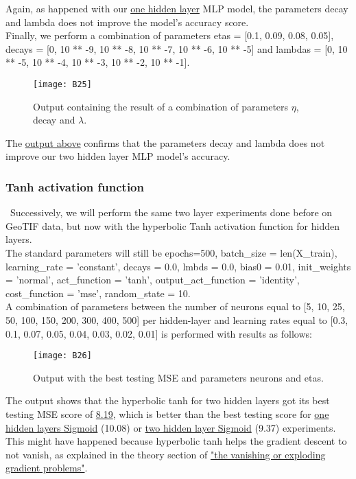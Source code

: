 Again, as happened with our \hyperref[fig:B9]{one hidden layer} MLP model, the parameters decay and lambda does not improve the model's accuracy score.\\

Finally, we perform a combination of parameters etas = [0.1, 0.09, 0.08, 0.05], decays = [0, 10 ** -9, 10 ** -8, 10 ** -7, 10 ** -6, 10 ** -5] and lambdas = [0, 10 ** -5, 10 ** -4, 10 ** -3, 10 ** -2, 10 ** -1].

\begin{figure}[H]
\label{fig:B17}
\centering
\texttt{[image: B25]}
\caption{Output containing the result of a combination of parameters $\eta$, decay and $\lambda$.}
\end{figure}

The \hyperref[fig:B17]{output above} confirms that the parameters decay and lambda does not improve our two hidden layer MLP model's accuracy.

\subsubsection{Tanh activation function}
\label{chap:Tanh activation function}

\qquad \, Successively, we will perform the same two layer experiments done before on GeoTIF data, but now with the hyperbolic Tanh activation function for hidden layers.\\

The standard parameters will still be epochs=500, batch\_size = len(X\_train), learning\_rate = 'constant', decays = 0.0, lmbds = 0.0, bias0 = 0.01, init\_weights = 'normal', act\_function = 'tanh', output\_act\_function = 'identity', cost\_function = 'mse', random\_state = 10.\\

A combination of parameters between the number of neurons equal to [5, 10, 25, 50, 100, 150, 200, 300, 400, 500] per hidden-layer and learning rates equal to [0.3, 0.1, 0.07, 0.05, 0.04, 0.03, 0.02, 0.01] is performed with results as follows:

\begin{figure}[H]
\label{fig:B18}
\centering
\texttt{[image: B26]}
\caption{Output with the best testing MSE and parameters neurons and etas.}
\end{figure}

The output shows that the hyperbolic tanh for two hidden layers got its best testing MSE score of \hyperref[fig:B18]{8.19}, which is better than the best testing score for \hyperref[fig:B1]{one hidden layers Sigmoid} (10.08) or \hyperref[fig:B10]{two hidden layer Sigmoid} (9.37) experiments. This might have happened because hyperbolic tanh helps the gradient descent to not vanish, as explained in the theory section of \hyperref[chap:The vanishing or exploding gradient problems]{"the vanishing or exploding gradient problems"}.

